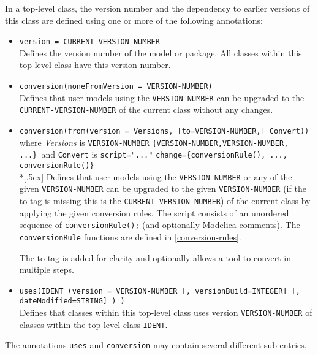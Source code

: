 In a top-level class, the version number and the dependency to earlier
versions of this class are defined using one or more of the following
annotations:
\begin{itemize}
\item
  \lstinline!version = CURRENT-VERSION-NUMBER!\\
  Defines the version number of the model or package. All classes within
  this top-level class have this version number.
\item
  \lstinline!conversion(noneFromVersion = VERSION-NUMBER)!\\
  Defines that user models using the \lstinline!VERSION-NUMBER! can be upgraded to
  the \lstinline!CURRENT-VERSION-NUMBER! of the current class without any changes.
\item
  \lstinline!conversion(from(version = Versions, [to=VERSION-NUMBER,] Convert))!\\
  where \emph{Versions} is \lstinline!VERSION-NUMBER! \textbar{}
   \lstinline!{VERSION-NUMBER,VERSION-NUMBER, ...}!\
  and \lstinline!Convert! is \lstinline!script="..."! \textbar{}
   \lstinline!change={conversionRule(), ..., conversionRule()}!\\*[.5ex]
  Defines that user models using the \lstinline!VERSION-NUMBER! or any of the given
  \lstinline!VERSION-NUMBER! can be upgraded to the given \lstinline!VERSION-NUMBER! (if the
  to-tag is missing this is the \lstinline!CURRENT-VERSION-NUMBER!) of the current
  class by applying the given conversion rules. The script consists of
  an unordered sequence of  \lstinline!conversionRule();! (and optionally Modelica
  comments). The  \lstinline!conversionRule! functions are defined in \cref{conversion-rules}.

  \begin{nonnormative}
  The to-tag is added for clarity and optionally allows a tool to convert in multiple steps.
  \end{nonnormative}
\item
  \lstinline!uses(IDENT (version = VERSION-NUMBER [, versionBuild=INTEGER] [, dateModified=STRING] ) )!\\
  Defines that classes within this top-level class uses version
  \lstinline!VERSION-NUMBER! of classes within the top-level class \lstinline!IDENT!.
\end{itemize}

The annotations \lstinline!uses! and \lstinline!conversion! may contain several different
sub-entries.

